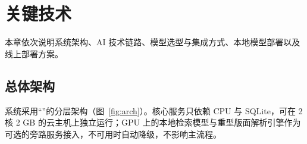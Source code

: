 \clearpage
\section{关键技术}\label{sec:ai}

本章依次说明系统架构、AI 技术链路、模型选型与集成方式、本地模型部署以及线上部署方案。

\subsection{总体架构}

系统采用“”的分层架构（图~\ref{fig:arch}）。核心服务只依赖 CPU 与 SQLite，可在 2 核 2 GB 的云主机上独立运行；GPU 上的本地检索模型与重型版面解析引擎作为可选的旁路服务接入，不可用时自动降级，不影响主流程。

